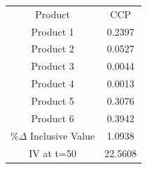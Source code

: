 \begin{tabular}{cc}
Product & CCP \\
Product 1 & 0.2397 \\
Product 2 & 0.0527 \\
Product 3 & 0.0044 \\
Product 4 & 0.0013 \\
Product 5 & 0.3076 \\
Product 6 & 0.3942 \\
$\%\Delta$ Inclusive Value & 1.0938 \\
IV at t=50 & 22.5608 \\
\end{tabular}